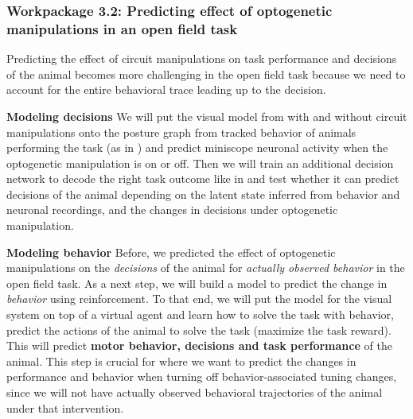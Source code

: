 \documentclass[B2,COG]{ercgrant}
\begin{document}
\subsubsection{Workpackage 3.2: Predicting effect of optogenetic manipulations in an open field task\hfill{}}

Predicting the effect of circuit manipulations on task performance and decisions of the animal becomes more challenging in the open field task because we need to account for the entire behavioral trace leading up to the decision. 

\textbf{Modeling decisions} 
We will put the visual model from  with and without circuit manipulations onto the posture graph from tracked behavior of animals performing the task (as in ) and predict miniscope neuronal activity when the optogenetic manipulation is on or off. 
Then we will train an additional decision network to decode the right task outcome like in  and test whether it can predict decisions of the animal depending on the latent state inferred from behavior and neuronal recordings, and the changes in decisions under optogenetic manipulation. 

\textbf{Modeling behavior} 
Before, we predicted the effect of optogenetic manipulations on the \textit{decisions} of the animal for \textit{actually observed behavior} in the open field task. 
As a next step, we will build a model to predict the change in \textit{behavior} using reinforcement.
To that end, we will put the model for the visual system on top of a virtual agent and learn how to solve the task with behavior, \ie predict the actions of the animal to solve the task (maximize the task reward). 
This will predict \textbf{motor behavior, decisions and task performance} of the animal. 
This step is crucial for  where we want to predict the changes in performance and behavior when turning off behavior-associated tuning changes, since we will not have actually observed behavioral trajectories of the animal under that intervention. 
\end{document}

